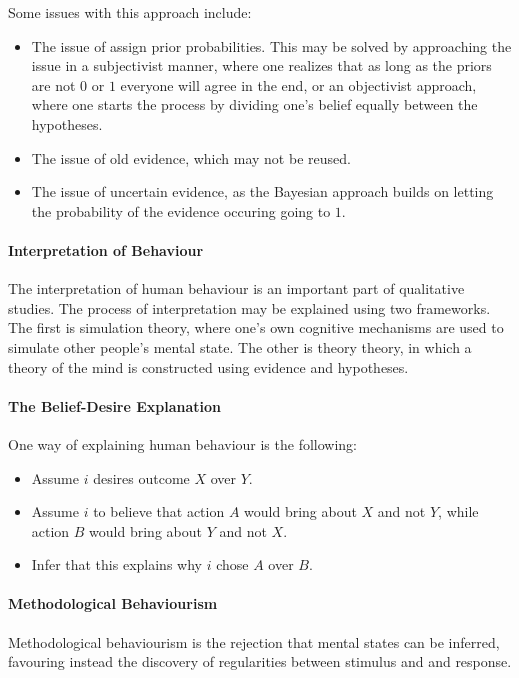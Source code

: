 Some issues with this approach include:
\begin{itemize}
	\item The issue of assign prior probabilities. This may be solved by approaching the issue in a subjectivist manner, where one realizes that as long as the priors are not $0$ or $1$ everyone will agree in the end, or an objectivist approach, where one starts the process by dividing one's belief equally between the hypotheses.
	\item The issue of old evidence, which may not be reused.
	\item The issue of uncertain evidence, as the Bayesian approach builds on letting the probability of the evidence occuring going to $1$.
\end{itemize}

\paragraph{Interpretation of Behaviour}
The interpretation of human behaviour is an important part of qualitative studies. The process of interpretation may be explained using two frameworks. The first is simulation theory, where one's own cognitive mechanisms are used to simulate other people's mental state. The other is theory theory, in which a theory of the mind is constructed using evidence and hypotheses.

\paragraph{The Belief-Desire Explanation}
One way of explaining human behaviour is the following:
\begin{itemize}
	\item Assume $i$ desires outcome $X$ over $Y$.
	\item Assume $i$ to believe that action $A$ would bring about $X$ and not $Y$, while action $B$ would bring about $Y$ and not $X$.
	\item Infer that this explains why $i$ chose $A$ over $B$.
\end{itemize}

\paragraph{Methodological Behaviourism}
Methodological behaviourism is the rejection that mental states can be inferred, favouring instead the discovery of regularities between stimulus and and response.

